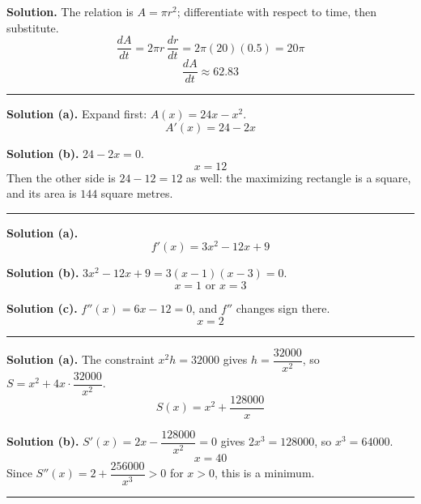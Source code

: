 \documentclass[12pt]{article}
\begin{document}



\textbf{Solution.} The relation is $A = \pi r^2$; differentiate with respect to
time, then substitute.
\[ \frac{dA}{dt} = 2\pi r\,\frac{dr}{dt} = 2\pi(20)(0.5) = 20\pi \]
\[ \boxed{\frac{dA}{dt} \approx 62.83} \]

\vspace{0.15cm}\noindent\rule{\linewidth}{0.2pt}


\textbf{Solution (a).} Expand first: $A(x) = 24x - x^2$.
\[ \boxed{A'(x) = 24 - 2x} \]

\textbf{Solution (b).} $24 - 2x = 0$.
\[ \boxed{x = 12} \]
Then the other side is $24 - 12 = 12$ as well: the maximizing rectangle is a
square, and its area is $144$ square metres.

\vspace{0.15cm}\noindent\rule{\linewidth}{0.2pt}


\textbf{Solution (a).}
\[ \boxed{f'(x) = 3x^2 - 12x + 9} \]

\textbf{Solution (b).} $3x^2 - 12x + 9 = 3(x - 1)(x - 3) = 0$.
\[ \boxed{x = 1 \text{ or } x = 3} \]

\textbf{Solution (c).} $f''(x) = 6x - 12 = 0$, and $f''$ changes sign there.
\[ \boxed{x = 2} \]

\vspace{0.15cm}\noindent\rule{\linewidth}{0.2pt}


\textbf{Solution (a).} The constraint $x^2h = 32000$ gives
$h = \dfrac{32000}{x^2}$, so $S = x^2 + 4x\cdot\dfrac{32000}{x^2}$.
\[ \boxed{S(x) = x^2 + \frac{128000}{x}} \]

\textbf{Solution (b).} $S'(x) = 2x - \dfrac{128000}{x^2} = 0$ gives
$2x^3 = 128000$, so $x^3 = 64000$.
\[ \boxed{x = 40} \]
Since $S''(x) = 2 + \dfrac{256000}{x^3} > 0$ for $x > 0$, this is a minimum.

\vspace{0.15cm}\noindent\rule{\linewidth}{0.2pt}
\end{document}
